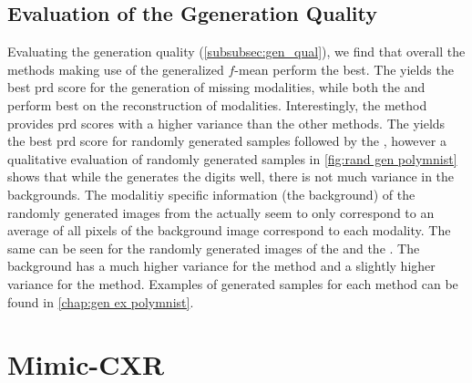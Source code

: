 \subsection{Evaluation of the Ggeneration Quality}
Evaluating the generation quality (\cref{subsubsec:gen_qual}), we find that overall the methods making use of the generalized $f$-mean perform the best.
The  yields the best prd score for the generation of missing modalities, while both the  and  perform best on the reconstruction of modalities.
Interestingly, the  method provides prd scores with a higher variance than the other methods.
The  yields the best prd score for randomly generated samples followed by the , however a qualitative evaluation of randomly generated samples in \cref{fig:rand gen polymnist} shows that while the  generates the digits well, there is not much variance in the backgrounds.
The modalitiy specific information (the background) of the randomly generated images from the  actually seem to only correspond to an average of all pixels of the background image correspond to each modality.
The same can be seen for the randomly generated images of the  and the .
The background has a much higher variance for the  method and a slightly higher variance for the  method.
Examples of generated samples for each method can be found in \cref{chap:gen ex polymnist}.



\section{Mimic-CXR}
